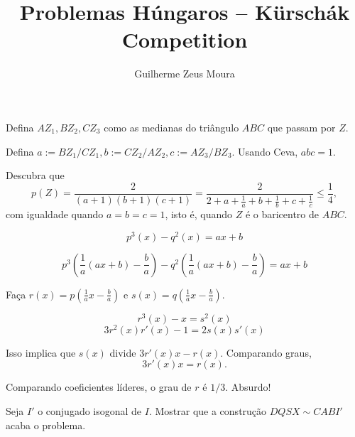 \documentclass[11pt,a4paper]{article}
\title{Problemas Húngaros – K\"{u}rsch\'{a}k Competition}
\author{Guilherme Zeus Moura}
\begin{document}
	
	\zeustitle

	\begin{sk}
		Defina $AZ_1, BZ_2, CZ_3$ como as medianas do triângulo $ABC$ que passam por $Z$.

		Defina $a := BZ_1/CZ_1, b := CZ_2/AZ_2, c := AZ_3/BZ_3$. Usando Ceva, $abc = 1$.

		Descubra que \[
			p(Z) = \frac{2}{(a+1)(b+1)(c+1)} = \frac{2}{2 + a + \frac{1}{a} + b + \frac{1}{b} + c + \frac{1}{c}} \le \frac{1}{4},
		\]
		com igualdade quando $a = b = c = 1$, isto é, quando $Z$ é o baricentro de $ABC$.
	\end{sk}
	
	\newpage
	\begin{sk}
		\[
			p^3(x) - q^2(x) = ax + b
		\]

		\[
			p^3\left(\frac{1}{a}(ax + b) - \frac{b}{a}\right) - q^2\left(\frac{1}{a}(ax + b) - \frac{b}{a}\right) = ax + b
		\]

		Faça
		$r(x) = p\left(\frac{1}{a}x - \frac{b}{a}\right)$ e
		$s(x) = q\left(\frac{1}{a}x - \frac{b}{a}\right)$.
		
		\[
			r^3(x) - x = s^2(x)
		\]
		\[
			3r^2(x)r'(x) - 1 = 2s(x)s'(x)
		\]

		Isso implica que $s(x)$ divide $3r'(x)x - r(x)$. Comparando graus,  \[
			3r'(x)x = r(x).
		\]

		Comparando coeficientes líderes, o grau de $r$ é $1/3$. Absurdo!

	\end{sk}
	
	\newpage

	\newpage

	\begin{sk}
		Seja $I'$ o conjugado isogonal de $I$.
		Mostrar que a construção $DQSX \sim CABI'$ acaba o problema.
	\end{sk}

	\newpage
\end{document}
